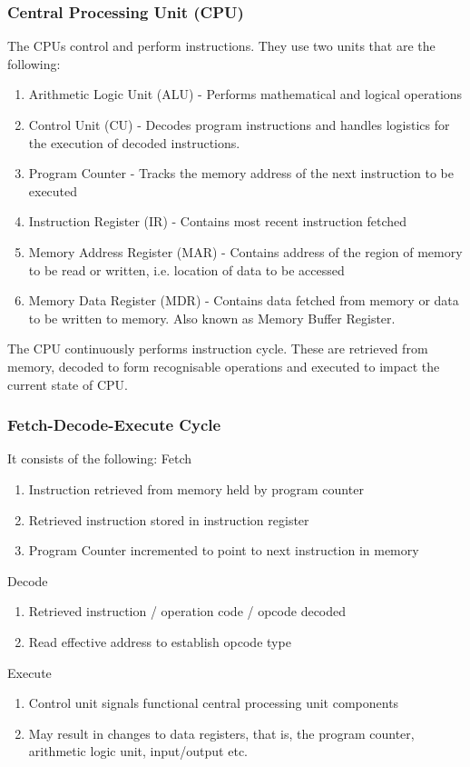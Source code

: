 \documentclass[a4paper]{article}
\theoremstyle{plain}
\theoremstyle{definition}
\theoremstyle{remark}
\begin{document}
\subsubsection{Central Processing Unit (CPU)}
The CPUs control and perform instructions. They use two units that are the following:
\begin{enumerate}
	\item Arithmetic Logic Unit (ALU) - Performs mathematical and logical operations
	\item Control Unit (CU) - Decodes program instructions and handles logistics for the execution of decoded instructions.
	\item Program Counter - Tracks the memory address of the next instruction to be executed
	\item Instruction Register (IR) - Contains most recent instruction fetched
	\item Memory Address Register (MAR) - Contains address of the region of memory to be read or written, i.e. location of data to be accessed
	\item Memory Data Register (MDR) - Contains data fetched from memory or data to be written to memory. Also known as Memory Buffer Register.
\end{enumerate}
The CPU continuously performs instruction cycle. These are retrieved from memory, decoded to form recognisable operations and executed to impact the current state of CPU.
\subsubsection{Fetch-Decode-Execute Cycle}
It consists of the following:
Fetch
\begin{enumerate}
	\item Instruction retrieved from memory held by program counter
	\item Retrieved instruction stored in instruction register
	\item Program Counter incremented to point to next instruction in memory
\end{enumerate}
Decode
\begin{enumerate}
	\item Retrieved instruction / operation code / opcode decoded
	\item Read effective address to establish opcode type 
\end{enumerate}
Execute
\begin{enumerate}
	\item Control unit signals functional central processing unit components
	\item May result in changes to data registers, that is, the program counter, arithmetic logic unit, input/output etc.
\end{enumerate}
\end{document}
